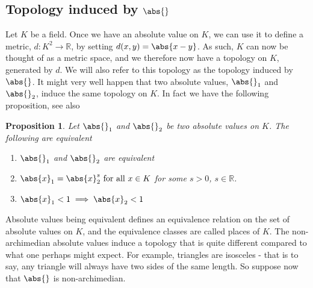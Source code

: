 \documentclass{article}
\newtheorem{proposition}{Proposition}[section]
\newcommand{\mbb}[1]{\mathbb{#1}}
\numberwithin{equation}{section}
\begin{document}


\subsection{Topology induced by $\abs{}$}
Let $K$ be a field. Once we have an absolute value on $K$, we can use it to define a metric, $d : K^2 \to \mbb R$, by setting $d(x,y) = \abs{x - y}$. As such, $K$ can now be thought of as a metric space, and we therefore now have a topology on $K$, generated by $d$. We will also refer to this topology as the topology induced by $\abs{}$. It might very well happen that two absolute values, $\abs{}_1$ and $\abs{}_2$, induce the same topology on $K$. In fact we have the following proposition, see also \citep[Proposition 3.3]{neukirch}
\begin{proposition}\label{Equivalent absolute values}
	Let $\abs{}_1$ and $\abs{}_2$ be two absolute values on $K$. The following are equivalent
	\begin{enumerate}
    	\item $\abs{}_1$ and $\abs{}_2$ are equivalent
    	\item $\abs{x}_1 = \abs{x}_2^s \text{ for all } x\in K$ for some $s > 0$, $s \in \mbb R$.
    	\item $\abs{x}_1 < 1 \implies \abs{x}_2 < 1$
	\end{enumerate}
\end{proposition}



Absolute values being equivalent defines an equivalence relation on the set of absolute values on $K$, and the equivalence classes are called places of $K$. The non-archimedian absolute values induce a topology that is quite different compared to what one perhaps might expect. For example, triangles are isosceles - that is to say, any triangle will always have two sides of the same length. So suppose now that $\abs{}$ is non-archimedian. 
\end{document}

